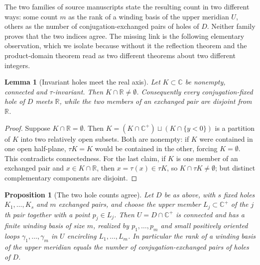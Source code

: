 \documentclass[11pt,a4paper]{article}
\numberwithin{equation}{section}
\newtheorem{proposition}[theorem]{Proposition}
\newtheorem{lemma}[theorem]{Lemma}
\theoremstyle{definition}
\theoremstyle{remark}
\theoremstyle{plain}
\newcommand{\RR}{\mathbb R}
\newcommand{\CC}{\mathbb C}
\newcommand{\Cplus}{\CC^{+}}
\begin{document}
The two families of source manuscripts state the resulting count in two
different ways: some count $m$ as the rank of a winding basis of the
upper meridian $U$, others as the number of conjugation-exchanged pairs
of holes of $D$.  Neither family proves that the two indices agree.  The
missing link is the following elementary observation, which we isolate
because without it the reflection theorem and the product-domain theorem
read as two different theorems about two different integers.

\begin{lemma}[Invariant holes meet the real axis]
\label{c:lem:invariant-holes}
Let $K\subset\CC$ be nonempty, connected and $\tau$-invariant.  Then
$K\cap\RR\ne\emptyset$.  Consequently every conjugation-fixed hole of $D$
meets $\RR$, while the two members of an exchanged pair are disjoint from
$\RR$.
\end{lemma}

\begin{proof}
Suppose $K\cap\RR=\emptyset$.  Then
$K=(K\cap\Cplus)\sqcup(K\cap\{y<0\})$ is a partition of $K$ into two
relatively open subsets.  Both are nonempty: if $K$ were contained in one
open half-plane, $\tau K=K$ would be contained in the other, forcing
$K=\emptyset$.  This contradicts connectedness.  For the last claim, if
$K$ is one member of an exchanged pair and $x\in K\cap\RR$, then
$x=\tau(x)\in\tau K$, so $K\cap\tau K\ne\emptyset$; but distinct
complementary components are disjoint.
\end{proof}

\begin{proposition}[The two hole counts agree]
\label{c:prop:bridge}
Let $D$ be as above, with $s$ fixed holes $K_1,\dots,K_s$ and $m$
exchanged pairs, and choose the upper member $L_j\subset\Cplus$ of the
$j$th pair together with a point $p_j\in L_j$.  Then
$U=D\cap\Cplus$ is connected and has a finite winding basis of size $m$,
realized by $p_1,\dots,p_m$ and small positively oriented loops
$\gamma_1,\dots,\gamma_m$ in $U$ encircling $L_1,\dots,L_m$.  In
particular the rank of a winding basis of the upper meridian equals the
number of conjugation-exchanged pairs of holes of $D$.
\end{proposition}
\end{document}
